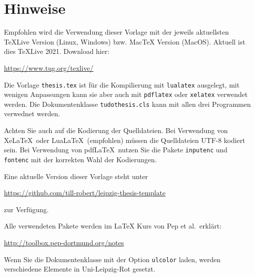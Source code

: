 \thispagestyle{empty}
\setcounter{page}{2}
\section*{Hinweise}
Empfohlen wird die Verwendung dieser Vorlage mit der jeweils aktuellsten TeXLive Version (Linux, Windows) bzw. MacTeX Version (MacOS).
Aktuell ist dies TeXLive 2021. Download hier:
\begin{center}
  \ttfamily\url{https://www.tug.org/texlive/}
\end{center}

Die Vorlage \texttt{thesis.tex} ist für die Kompilierung mit \texttt{lualatex} ausgelegt, mit wenigen Anpassungen kann sie aber auch mit \texttt{pdflatex} oder \texttt{xelatex} verwendet werden.
Die Dokumentenklasse \texttt{tudothesis.cls} kann mit allen drei Programmen verwednet werden.

Achten Sie auch auf die Kodierung der Quelldateien.
Bei Verwendung von Xe\LaTeX\ oder Lua\LaTeX\ (empfohlen) müssen die
Quelldateien UTF-8 kodiert sein.
Bei Verwendung von pdf\LaTeX\ nutzen Sie die Pakete \texttt{inputenc} und \texttt{fontenc} mit der korrekten Wahl der Kodierungen.

Eine aktuelle Version dieser Vorlage steht unter 
\begin{center}
  \ttfamily\url{https://github.com/till-robert/leipzig-thesis-template}
\end{center}
zur Verfügung.

Alle verwendeten Pakete werden im \LaTeX{} Kurs von Pep et al.\ erklärt:
\begin{center}
  \ttfamily\url{http://toolbox.pep-dortmund.org/notes}
\end{center}



Wenn Sie die Dokumentenklasse mit der Option \texttt{ulcolor} laden, werden verschiedene Elemente in Uni-Leipzig-Rot gesetzt.
